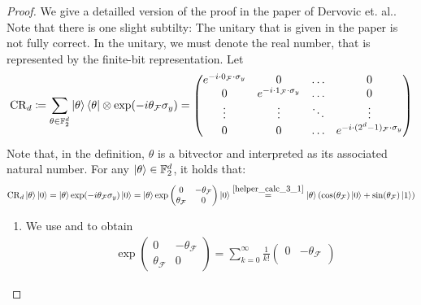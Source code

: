 \begin{proof}
    We give a detailled version of the proof in the paper of Dervovic et. al.. Note that there is one slight subtilty: The unitary that is given in the paper is not fully correct. In the unitary, we must denote the real number, that is represented by the finite-bit representation. Let
    \begin{align}
        \operatorname{CR}_d \coloneqq \sum_{\theta \in \mathbb{F}_2^d} \ket{\theta}\bra{\theta} \otimes \exp(-i\theta_{\mathcal{F}}\sigma_y) = \begin{pmatrix}
            e^{-i \cdot 0_{\mathcal{F}} \cdot \sigma_y} & 0 & \hdots & 0\\
            0 & e^{-i \cdot 1_{\mathcal{F}} \cdot \sigma_y} & \hdots & 0\\
            \vdots & \vdots & \ddots & \vdots\\
            0 & 0 & \hdots & e^{-i \cdot (2^d-1)_{\mathcal{F}} \cdot \sigma_y}
        \end{pmatrix}
    \end{align}
    Note that, in the definition, \(\theta\) is a bitvector and interpreted as its associated natural number. For any \(\ket{\theta} \in \mathbb{F}_2^d\), it holds that:
    \begin{align}
        \operatorname{CR}_d\ket{\theta}\ket{0} = \ket{\theta}\exp(-i\theta_{\mathcal{F}}\sigma_y)\ket{0} = \ket{\theta}\exp\begin{pmatrix}
            0 & -\theta_{\mathcal{F}}\\
            \theta_{\mathcal{F}} & 0
        \end{pmatrix}\ket{0} \overset{\ref{helper_calc_3_1}}{=} \ket{\theta}(\cos(\theta_{\mathcal{F}})\ket{0}+\sin(\theta_{\mathcal{F}})\ket{1})
    \end{align}
    \begin{enumerate}[label=(\arabic*)]
        \item \label{helper_calc_3_1} We use  and  to obtain
        \begin{align}
            &\exp\begin{pmatrix}
                0 & -\theta_{\mathcal{F}}\\
                \theta_{\mathcal{F}} & 0
            \end{pmatrix} = \sum_{k=0}^\infty \frac{1}{k!} \begin{pmatrix}
                0 & -\theta_{\mathcal{F}}\\

\end{pmatrix}
\end{align}
\end{enumerate}
\end{proof}
